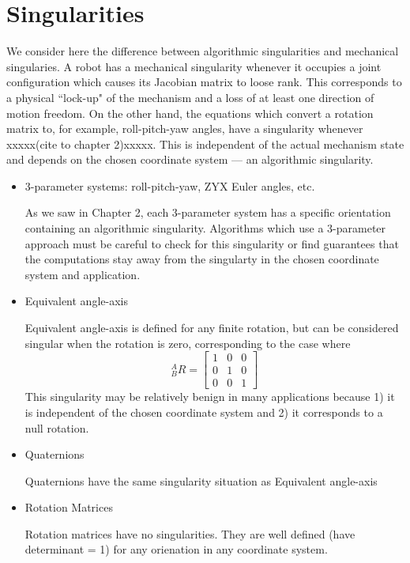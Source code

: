 \section{Singularities}

We consider here the difference between algorithmic singularities and mechanical singularies.   A robot has a mechanical singularity whenever it occupies a joint configuration which causes its Jacobian matrix to loose rank.  This corresponds to a physical ``lock-up" of the mechanism and a loss of at least one direction of motion freedom.  On the other hand, the equations which convert a rotation matrix to, for example, roll-pitch-yaw angles, have a singularity whenever xxxxx(cite to chapter 2)xxxxx.    This is independent of the actual mechanism state and depends on the chosen coordinate system --- an algorithmic singularity.

\begin{itemize}
  \item 3-parameter systems:  roll-pitch-yaw,  ZYX Euler angles,  etc.

As we saw in Chapter 2, each 3-parameter system has a specific orientation containing an algorithmic singularity.  Algorithms which use a 3-parameter approach must be careful to check for this singularity or find guarantees that the computations stay away from the singularty in the chosen coordinate system and application.

  \item Equivalent angle-axis

Equivalent angle-axis is defined for any finite rotation, but can be considered singular when the rotation is zero, corresponding to the case where
\[
{^A_BR} = \begin{bmatrix}  1&0&0 \\0&1&0\\0&0&1\end{bmatrix}
\]
This singularity may be relatively benign in many applications because 1) it is independent of the chosen coordinate system and 2) it corresponds to a null rotation.


  \item Quaternions

Quaternions have the same singularity situation as Equivalent angle-axis


  \item Rotation Matrices

Rotation matrices have no singularities.  They are well defined (have determinant = 1) for any orienation in any coordinate system.

\end{itemize}



